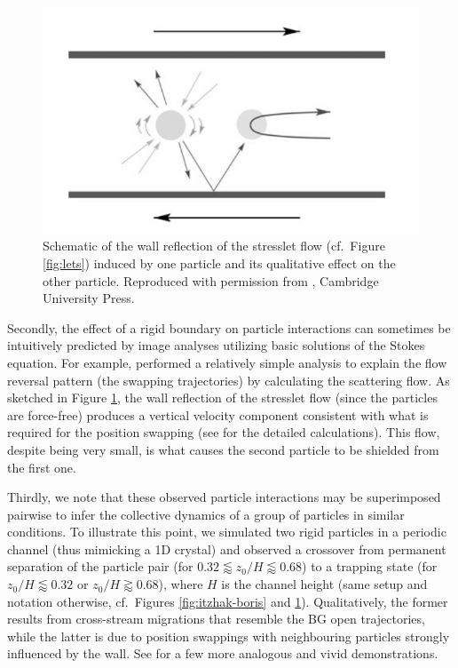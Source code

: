 \begin{figure}%
  \centering
  \includegraphics[width=0.55\columnwidth]{stresslet_reflection.png}
  \caption{Schematic of the wall reflection of the stresslet flow (cf.\ Figure \ref{fig:lets}) induced by one particle and its qualitative effect on the other particle. Reproduced with permission from \cite{zurita-gotor_2007}, \textcopyright \enspace Cambridge University Press.}
  \label{fig:stresslet-refl}
\end{figure}

Secondly, the effect of a rigid boundary on particle interactions can sometimes be intuitively predicted by image analyses utilizing basic solutions of the Stokes equation.
For example, \cite{zurita-gotor_2007} performed a relatively simple analysis to explain the flow reversal pattern (\ie the swapping trajectories) by calculating the scattering flow.
As sketched in Figure \ref{fig:stresslet-refl}, the wall reflection of the stresslet flow (since the particles are force-free) produces a vertical velocity component consistent with what is required for the position swapping (see \cite{zurita-gotor_2007} for the detailed calculations). This flow, despite being very small, is what causes the second particle to be shielded from the first one.

Thirdly, we note that these observed particle interactions may be superimposed pairwise to infer the collective dynamics of a group of particles in similar conditions.
To illustrate this point, we simulated two rigid particles in a periodic channel (thus mimicking a 1D crystal) and observed a crossover from permanent separation of the particle pair (for $0.32 \lessapprox z_0/H \lessapprox 0.68$) to a trapping state (for $z_0/H \lessapprox 0.32$ or $z_0/H \gtrapprox 0.68$), where $H$ is the channel height (same setup and notation otherwise, cf.\ Figures \ref{fig:itzhak-boris} and \ref{fig:stresslet-refl}).
Qualitatively, the former results from cross-stream migrations that resemble the BG open trajectories, while the latter is due to position swappings with neighbouring particles strongly influenced by the wall.
See \cite{Beatus2006, Janssen2012, Uspal2013} for a few more analogous and vivid demonstrations.

